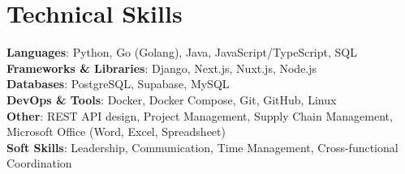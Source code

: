\documentclass[letterpaper,11pt]{article}
\begin{document}
\section{Technical Skills}
 \begin{itemize}[leftmargin=0.15in, label={}]
    \small{\item{
     \textbf{Languages}{: Python, Go (Golang), Java, JavaScript/TypeScript, SQL} \\
     \textbf{Frameworks \& Libraries}{: Django, Next.js, Nuxt.js, Node.js} \\
     \textbf{Databases}{: PostgreSQL, Supabase, MySQL} \\
     \textbf{DevOps \& Tools}{: Docker, Docker Compose, Git, GitHub, Linux} \\
     \textbf{Other}{: REST API design, Project Management, Supply Chain Management, Microsoft Office (Word, Excel, Spreadsheet)} \\
     \textbf{Soft Skills}{: Leadership, Communication, Time Management, Cross-functional Coordination}
    }}
 \end{itemize}


\end{document}
